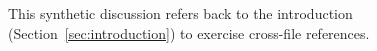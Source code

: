 This synthetic discussion refers back to the introduction (Section~\ref{sec:introduction})
to exercise cross-file references.
